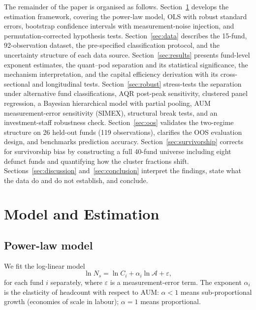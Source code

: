 \documentclass[12pt]{article}
\newcommand{\Ns}{N_{s}}
\newcommand{\Ac}{\mathcal{A}}
\begin{document}
\medskip\noindent
The remainder of the paper is organised as follows.
Section~\ref{sec:methods} develops the estimation framework,
covering the power-law model, OLS with robust standard errors,
bootstrap confidence intervals with measurement-noise injection,
and permutation-corrected hypothesis tests.
Section~\ref{sec:data} describes the 15-fund, 92-observation
dataset, the pre-specified classification protocol, and the
uncertainty structure of each data source.
Section~\ref{sec:results} presents fund-level exponent estimates,
the quant--pod separation and its statistical significance,
the mechanism interpretation, and the capital efficiency
derivation with its cross-sectional and longitudinal tests.
Section~\ref{sec:robust} stress-tests the separation under
alternative fund classifications, AQR post-peak sensitivity,
clustered panel regression, a Bayesian hierarchical model with
partial pooling, AUM measurement-error sensitivity (SIMEX),
structural break tests, and an investment-staff robustness check.
Section~\ref{sec:oos} validates the two-regime structure on
26 held-out funds (119 observations), clarifies the OOS
evaluation design, and benchmarks prediction accuracy.
Section~\ref{sec:survivorship} corrects for survivorship bias
by constructing a full 40-fund universe including eight defunct
funds and quantifying how the cluster fractions shift.
Sections~\ref{sec:discussion} and~\ref{sec:conclusion} interpret
the findings, state what the data do and do not establish,
and conclude.


\section{Model and Estimation}
\label{sec:methods}

\subsection{Power-law model}

We fit the log-linear model
\begin{equation}
  \label{eq:loglinear}
  \ln \Ns = \ln C_i + \alpha_i \ln \Ac + \varepsilon,
\end{equation}
for each fund $i$ separately, where $\varepsilon$ is a
measurement-error term.
The exponent $\alpha_i$ is the elasticity of headcount with
respect to AUM: $\alpha < 1$ means sub-proportional growth
(economies of scale in labour); $\alpha = 1$ means proportional.
\end{document}
